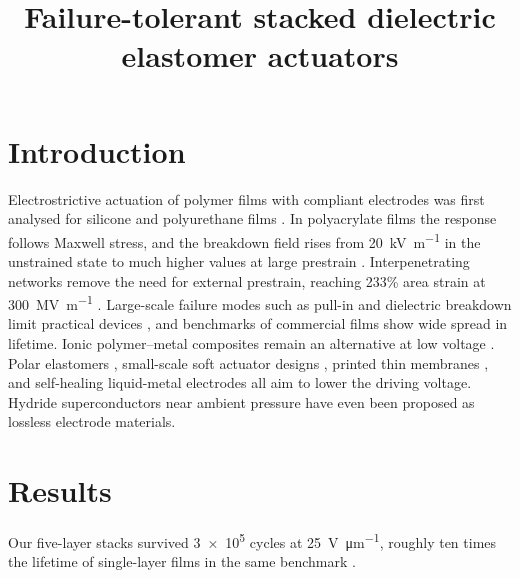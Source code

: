 \documentclass{article}
\title{Failure-tolerant stacked dielectric elastomer actuators}
\author{}
\date{}
\begin{document}
\maketitle

\section{Introduction}
Electrostrictive actuation of polymer films with compliant electrodes was first analysed for silicone and polyurethane films \cite{pelrine1998}. In polyacrylate films the response follows Maxwell stress, and the breakdown field rises from \SI{20}{\kilo\volt\per\metre} in the unstrained state to much higher values at large prestrain \cite{kofod2003}. Interpenetrating networks remove the need for external prestrain, reaching 233\% area strain at \SI{300}{\mega\volt\per\metre} \cite{ha2006}. Large-scale failure modes such as pull-in and dielectric breakdown limit practical devices \cite{plante2006, wissler2005}, and benchmarks of commercial films \cite{jordi2011} show wide spread in lifetime. Ionic polymer--metal composites remain an alternative at low voltage \cite{shahinpoor2001}. Polar elastomers \cite{opris2018}, small-scale soft actuator designs \cite{hines2017}, printed thin membranes \cite{poulin2015}, and self-healing liquid-metal electrodes \cite{kim2020selfhealing} all aim to lower the driving voltage. Hydride superconductors near ambient pressure \cite{dasenbrock2023} have even been proposed as lossless electrode materials.

\section{Results}
Our five-layer stacks survived \num{3e5} cycles at \SI{25}{\volt\per\micro\metre}, roughly ten times the lifetime of single-layer films in the same benchmark \cite{jordi2011}.



\end{document}
